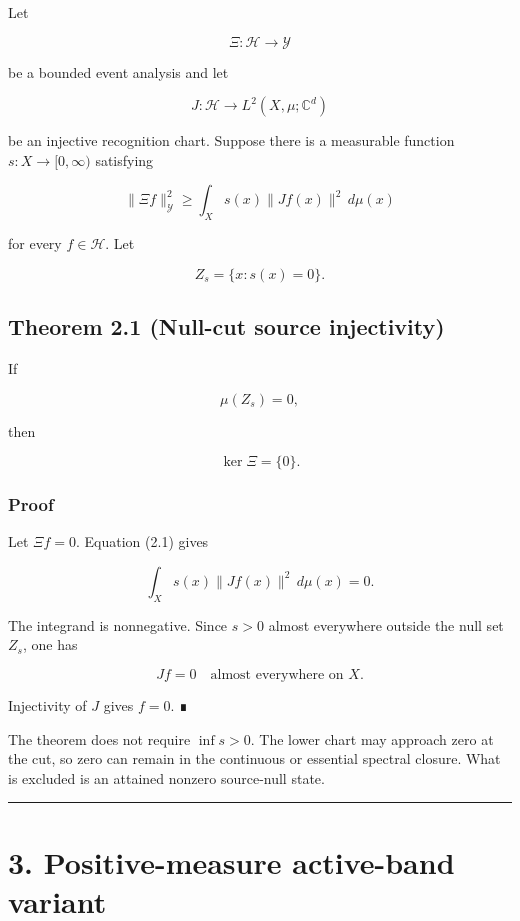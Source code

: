 Let

\[
\Xi:\mathcal H\longrightarrow\mathcal Y
\]

be a bounded event analysis and let

\[
J:\mathcal H\longrightarrow L^2(X,\mu;\mathbb C^d)
\]

be an injective recognition chart. Suppose there is a measurable function
\(s:X\to[0,\infty)\) satisfying

\[
\boxed{
\|\Xi f\|_{\mathcal Y}^2
\ge
\int_X s(x)\|Jf(x)\|^2\,d\mu(x)
}
\tag{2.1}
\]

for every \(f\in\mathcal H\). Let

\[
Z_s=\{x:s(x)=0\}.
\]

\hypertarget{theorem-2.1-null-cut-source-injectivity}{%
\subsection{Theorem 2.1 (Null-cut source injectivity)}\label{theorem-2.1-null-cut-source-injectivity}}

If

\[
\mu(Z_s)=0,
\]

then

\[
\boxed{
\ker\Xi=\{0\}.
}
\tag{2.2}
\]

\hypertarget{proof}{%
\subsubsection{Proof}\label{proof}}

Let \(\Xi f=0\). Equation (2.1) gives

\[
\int_X s(x)\|Jf(x)\|^2\,d\mu(x)=0.
\]

The integrand is nonnegative. Since \(s>0\) almost everywhere outside the
null set \(Z_s\), one has

\[
Jf=0
\quad\text{almost everywhere on }X.
\]

Injectivity of \(J\) gives \(f=0\). ∎

The theorem does not require \(\inf s>0\). The lower chart may approach zero
at the cut, so zero can remain in the continuous or essential spectral
closure. What is excluded is an attained nonzero source-null state.

\begin{center}\rule{0.5\linewidth}{0.5pt}\end{center}

\hypertarget{positive-measure-active-band-variant}{%
\section{3. Positive-measure active-band variant}\label{positive-measure-active-band-variant}}

